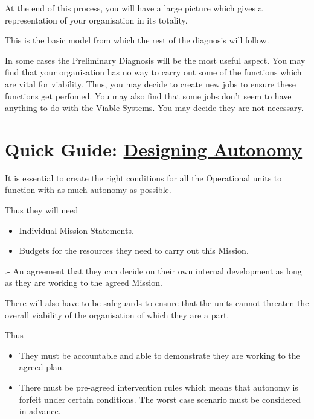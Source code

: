 At the end of this process, you will have a large picture which gives a representation of your organisation in its totality.

This is the basic model from which the rest of the diagnosis will follow.

In some cases the \href{https://vsmg.lrc.org.uk/3pd_5sys.html}{Preliminary Diagnosis} will be the most useful aspect. You may find that your organisation has no way to carry out some of the functions which are vital for viability. Thus, you may decide to create new jobs to ensure these functions get perfomed. You may also find that some jobs don't seem to have anything to do with the Viable Systems. You may decide they are not necessary.

\section*{Quick Guide: \href{https://vsmg.lrc.org.uk/screen.php?page=4autonomy}{Designing Autonomy}}
It is essential to create the right conditions for all the Operational units to function with as much autonomy as possible.

Thus they will need

\begin{itemize}
  \item Individual Mission Statements.

  \item Budgets for the resources they need to carry out this Mission.

\end{itemize}

.-   An agreement that they can decide on their own internal development as long as they are working to the agreed Mission.

There will also have to be safeguards to ensure that the units cannot threaten the overall viability of the organisation of which they are a part.

Thus

\begin{itemize}
  \item They must be accountable and able to demonstrate they are working to the agreed plan.

  \item There must be pre-agreed intervention rules which means that autonomy is forfeit under certain conditions. The worst case scenario must be considered in advance.

\end{itemize}

